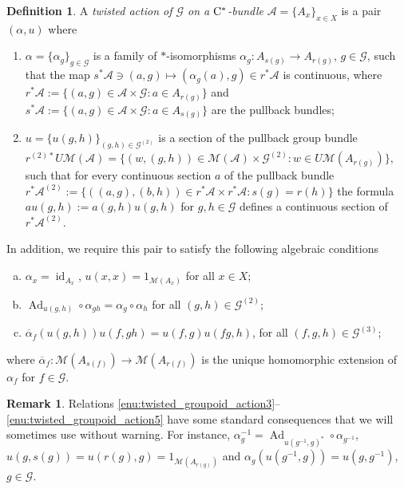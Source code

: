 \documentclass[11 pt, leqno]{amsart}
\numberwithin{equation}{section}
\theoremstyle{plain}
\theoremstyle{definition}
\newtheorem {defn}[thm] {Definition}
\newtheorem {rem} [thm]{Remark}
\DeclareMathOperator{\id}{id}
\DeclareMathOperator{\Ad}{Ad}
\newcommand{\M}{\mathcal M}
\newcommand{\G}{\mathcal G} %
\newcommand{\A}{\mathcal A}
\newcommand{\cst}{\ifmmode\mathrm{C}^*\else{$\mathrm{C}^*$}\fi}
\begin{document}
\begin{defn}\label{def:twisted_groupoid_action}
A \emph{twisted action of  $\G$ on a $\cst$-bundle} $\A=\{A_x\}_{x\in X}$ %
is a pair $(\alpha, u)$ where 
\begin{enumerate}
    \item\label{enu:twisted_groupoid_action1} $\alpha=\{\alpha_{g}\}_{g\in \G}$ is a family of $*$-isomorphisms $\alpha_g:A_{s(g)}\to  A_{r(g)}$, $g\in \G$, such that the map $s^*\A \ni (a,g) \mapsto (\alpha_{g}(a),g) \in r^*\A$ is continuous, where $r^*\A :=\{ (a,g)\in  \A\times \G:  a\in A_{r(g)}\}$ and $s^*\A :=\{ (a,g)\in  \A\times \G:  a\in A_{s(g)}\}$ are the pullback bundles;

    \item\label{enu:twisted_groupoid_action2} $u=\{u(g,h)\}_{(g,h)\in \G^{(2)}}$ is a  section of the pullback group bundle $r^{(2)*}U\M(\A) = \{ (w,(g,h)) \in \M(\A) \times \G^{(2)}: w\in U\M(A_{r(g)}) \},$ %
    such that for every continuous section $a$ of the pullback bundle $r^{*}\A^{(2)}:=\{((a,g), (b,h))\in r^*\A \times r^*\A: s(g)=r(h)\}$ the formula $au(g,h):=a(g,h)u(g,h)$ for $g, h \in \G$ defines a continuous section of $r^{*}\A^{(2)}$.
\end{enumerate}
In addition, we require this pair to satisfy the following algebraic conditions
\begin{enumerate}[(a)]
    \item\label{enu:twisted_groupoid_action3} $\alpha_x = \id_{A_x}$, $u(x,x) = 1_{\M(A_x)}$ for all $x\in X$;
    \item\label{enu:twisted_groupoid_action4} $\Ad_{u(g,h)}\circ \alpha_{gh}=\alpha_{g}\circ\alpha_{h}$ for all $(g,h)\in \G^{(2)}$;
    \item\label{enu:twisted_groupoid_action5} $\overline{\alpha}_f(u(g,h)) u(f,gh) = u(f,g) u(fg,h)$, for all $(f,g,h)\in \G^{(3)}$;
\end{enumerate} 
where $\overline{\alpha}_{f} : \M(A_{s(f)})\to \M(A_{r(f)})$ is the unique homomorphic extension of $\alpha_f$ for $f\in \G$.
\end{defn}

\begin{rem}\label{rem:consequnces_twists_in_groupoid_actions}
Relations \ref{enu:twisted_groupoid_action3}--\ref{enu:twisted_groupoid_action5} have some standard consequences that we will sometimes use without warning. 
For instance, $\alpha_g^{-1}=\Ad_{u(g^{-1},g)^*}\circ \alpha_{g^{-1}}$, $u(g,s(g))=u(r(g),g)=1_{\M(A_{r(g)})}$ and $\alpha_g(u(g^{-1},g))=u(g,g^{-1})$, $g\in \G$.
\end{rem}
\end{document}
